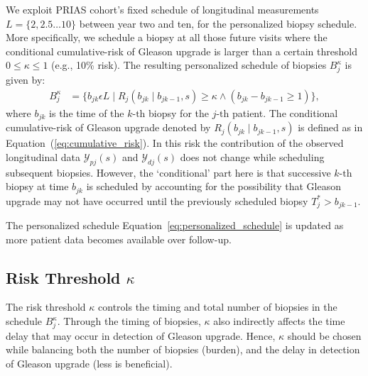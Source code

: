 We exploit PRIAS cohort's fixed schedule of longitudinal measurements ${L=\{2, 2.5 \ldots 10\}}$ between year two and ten, for the personalized biopsy schedule. More specifically, we schedule a biopsy at all those future visits where the conditional cumulative-risk of Gleason upgrade is larger than a certain threshold $0 \leq \kappa \leq 1$ (e.g., 10\% risk). The resulting personalized schedule of biopsies $B_j^{\kappa}$ is given by:
\begin{equation}
\label{eq:personalized_schedule}
\begin{split}
B_j^{\kappa} &= \Big\{b_{jk} \epsilon L \mid R_j(b_{jk} \mid b_{jk-1}, s) \geq \kappa \land (b_{jk}-b_{jk-1}\geq 1) \Big\},
\end{split}
\end{equation}
where $b_{jk}$ is the time of the ${k\mbox{-th}}$ biopsy for the ${j\mbox{-th}}$ patient. The conditional cumulative-risk of Gleason upgrade denoted by $R_j(b_{jk} \mid b_{jk-1}, s)$ is defined as in Equation~(\ref{eq:cumulative_risk}). In this risk the contribution of the observed longitudinal data $\mathcal{Y}_{pj}(s)$ and $\mathcal{Y}_{dj}(s)$ does not change while scheduling subsequent biopsies. However, the `conditional' part here is that successive ${k\mbox{-th}}$ biopsy at time $b_{jk}$ is scheduled by accounting for the possibility that Gleason upgrade may not have occurred until the previously scheduled biopsy $T^*_j > b_{jk-1}$.

The personalized schedule Equation~\ref{eq:personalized_schedule} is updated as more patient data becomes available over follow-up.

\subsection{Risk Threshold $\kappa$}
The risk threshold $\kappa$ controls the timing and total number of biopsies in the schedule $B_j^{\kappa}$. Through the timing of biopsies, $\kappa$ also indirectly affects the time delay that may occur in detection of Gleason upgrade. Hence, $\kappa$ should be chosen while balancing both the number of biopsies (burden), and the delay in detection of Gleason upgrade (less is beneficial).

